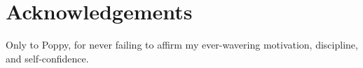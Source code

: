 \chapter*{Acknowledgements}

Only to Poppy, for never failing to affirm my ever-wavering
motivation, discipline, and self-confidence. 
